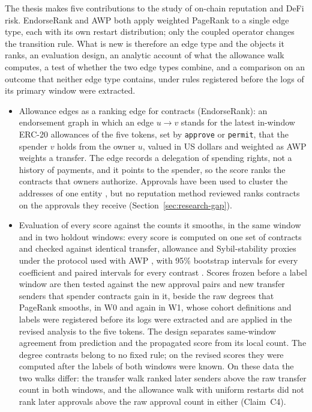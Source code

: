 The thesis makes five contributions to the study of on-chain reputation and DeFi risk. EndorseRank and AWP both apply weighted PageRank \parencite{page1999pagerank} to a single edge type, each with its own restart distribution; only the coupled operator changes the transition rule. What is new is therefore an edge type and the objects it ranks, an evaluation design, an analytic account of what the allowance walk computes, a test of whether the two edge types combine, and a comparison on an outcome that neither edge type contains, under rules registered before the logs of its primary window were extracted.
\begin{itemize}
\item Allowance edges as a ranking edge for contracts (EndorseRank): an endorsement graph in which an edge $u \to v$ stands for the latest in-window ERC-20 allowances of the five tokens, set by \texttt{approve} or \texttt{permit}, that the spender $v$ holds from the owner $u$, valued in US dollars and weighted as AWP weights a transfer. The edge records a delegation of spending rights, not a history of payments, and it points to the spender, so the score ranks the contracts that owners authorize. Approvals have been used to cluster the addresses of one entity \parencite{victor2020clustering}, but no reputation method reviewed ranks contracts on the approvals they receive (Section~\ref{sec:research-gap}).
\item Evaluation of every score against the counts it smooths, in the same window and in two holdout windows: every score is computed on one set of contracts and checked against identical transfer, allowance and Sybil-stability proxies under the protocol used with AWP \parencite{do2023awp}, with 95\% bootstrap intervals for every coefficient and paired intervals for every contrast \parencite{efron1979bootstrap}. Scores frozen before a label window are then tested against the new approval pairs and new transfer senders that spender contracts gain in it, beside the raw degrees that PageRank smooths, in W0 and again in W1, whose cohort definitions and labels were registered before its logs were extracted and are applied in the revised analysis to the five tokens. The design separates same-window agreement from prediction and the propagated score from its local count. The degree contrasts belong to no fixed rule; on the revised scores they were computed after the labels of both windows were known. On these data the two walks differ: the transfer walk ranked later senders above the raw transfer count in both windows, and the allowance walk with uniform restarts did not rank later approvals above the raw approval count in either (Claim~C4).

\end{itemize}
